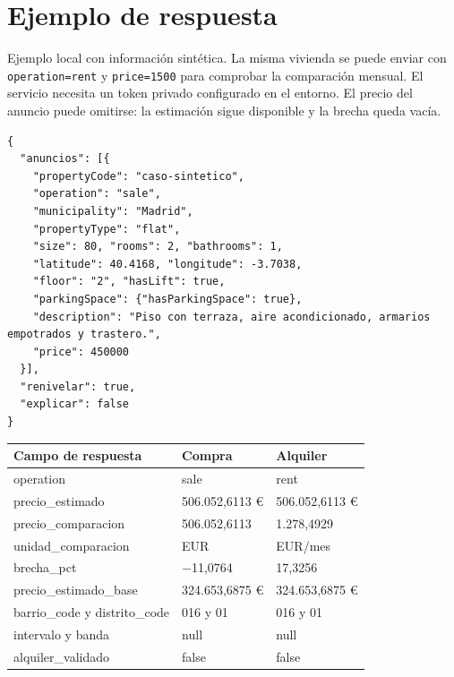 \documentclass[11pt,a4paper]{article}
\newcommand{\thead}[1]{\textbf{#1}}
\newcounter{anexo}
\begin{document}
\clearpage{}\label{anx:\theanexo}%
\section*{\theanexo\hspace{0.6em}Ejemplo de respuesta}

Ejemplo local con información sintética. La misma vivienda se puede enviar con \texttt{operation=rent} y \texttt{price=1500} para comprobar la comparación mensual. El servicio necesita un token privado configurado en el entorno. El precio del anuncio puede omitirse: la estimación sigue disponible y la brecha queda vacía.

\begin{lstlisting}
{
  "anuncios": [{
    "propertyCode": "caso-sintetico",
    "operation": "sale",
    "municipality": "Madrid",
    "propertyType": "flat",
    "size": 80, "rooms": 2, "bathrooms": 1,
    "latitude": 40.4168, "longitude": -3.7038,
    "floor": "2", "hasLift": true,
    "parkingSpace": {"hasParkingSpace": true},
    "description": "Piso con terraza, aire acondicionado, armarios empotrados y trastero.",
    "price": 450000
  }],
  "renivelar": true,
  "explicar": false
}
\end{lstlisting}

\begin{center}
\begin{tabularx}{\linewidth}{@{}L l l@{}}
\toprule
\thead{Campo de respuesta} & \thead{Compra} & \thead{Alquiler} \\
\midrule
operation & sale & rent \\
precio\_estimado & 506.052,6113 € & 506.052,6113 € \\
precio\_comparacion & 506.052,6113 & 1.278,4929 \\
unidad\_comparacion & EUR & EUR/mes \\
brecha\_pct & −11,0764 & 17,3256 \\
precio\_estimado\_base & 324.653,6875 € & 324.653,6875 € \\
barrio\_code y distrito\_code & 016 y 01 & 016 y 01 \\
intervalo y banda & null & null \\
alquiler\_validado & false & false \\
\bottomrule
\end{tabularx}
\end{center}
\end{document}
